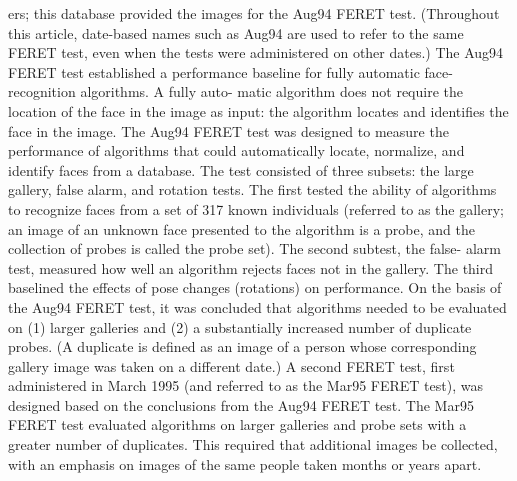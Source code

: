 ers; this database provided the images for the Aug94
FERET test. (Throughout this article, date-based names
such as Aug94 are used to refer to the same FERET test,
even when the tests were administered on other dates.) The
Aug94 FERET test established a performance baseline for
fully automatic face-recognition
algorithms. A fully auto-
matic algorithm does not require the location of the face in
the image as input: the algorithm locates and identifies the
face in the image.
The Aug94 FERET test was designed to measure the
performance of algorithms that could automatically locate,
normalize, and identify faces from a database. The test
consisted of three subsets: the large gallery, false alarm,
and rotation tests. The first tested the ability of algorithms
to recognize faces from a set of 317 known individuals
(referred to as the gallery; an image of an unknown face
presented to the algorithm is a probe, and the collection of
probes is called the probe set). The second subtest, the false-
alarm test, measured how well an algorithm rejects faces not
in the gallery. The third baselined the effects of pose
changes (rotations) on performance. On the basis of the
Aug94 FERET test, it was concluded that algorithms needed
to be evaluated on (1) larger galleries and (2) a substantially
increased number of duplicate probes. (A duplicate is
defined as an image of a person whose corresponding
gallery image was taken on a different date.)
A second FERET test, first administered in March 1995
(and referred to as the Mar95 FERET test), was designed
based on the conclusions from the Aug94 FERET test. The
Mar95 FERET test evaluated algorithms on larger galleries
and probe sets with a greater number of duplicates. This
required that additional images be collected, with an emphasis
on images of the same people taken months or years apart.

